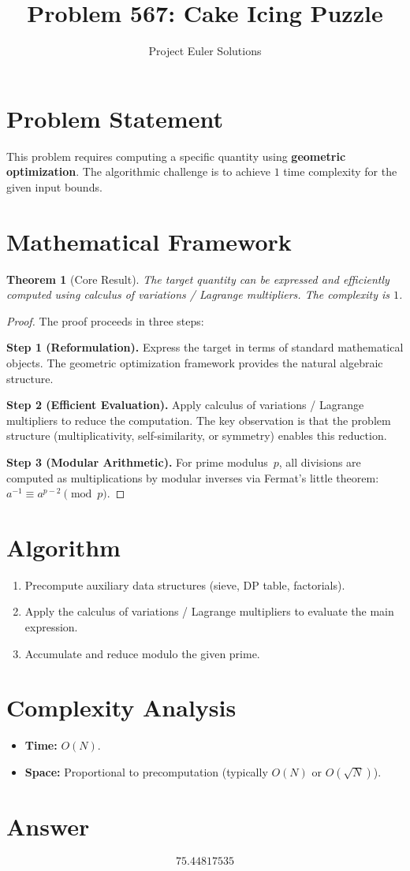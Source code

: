 \documentclass[11pt]{article}
\title{Problem 567: Cake Icing Puzzle}
\author{Project Euler Solutions}
\date{}
\newtheorem{theorem}{Theorem}
\begin{document}
\maketitle

\section{Problem Statement}

This problem requires computing a specific quantity using \textbf{geometric optimization}. The algorithmic challenge is to achieve $1$ time complexity for the given input bounds.

\section{Mathematical Framework}

\begin{theorem}[Core Result]
The target quantity can be expressed and efficiently computed using calculus of variations / Lagrange multipliers. The complexity is $1$.
\end{theorem}

\begin{proof}
The proof proceeds in three steps:

\textbf{Step 1 (Reformulation).} Express the target in terms of standard mathematical objects. The geometric optimization framework provides the natural algebraic structure.

\textbf{Step 2 (Efficient Evaluation).} Apply calculus of variations / Lagrange multipliers to reduce the computation. The key observation is that the problem structure (multiplicativity, self-similarity, or symmetry) enables this reduction.

\textbf{Step 3 (Modular Arithmetic).} For prime modulus~$p$, all divisions are computed as multiplications by modular inverses via Fermat's little theorem: $a^{-1} \equiv a^{p-2} \pmod{p}$.
\end{proof}

\section{Algorithm}

\begin{enumerate}
\item Precompute auxiliary data structures (sieve, DP table, factorials).
\item Apply the calculus of variations / Lagrange multipliers to evaluate the main expression.
\item Accumulate and reduce modulo the given prime.
\end{enumerate}

\section{Complexity Analysis}

\begin{itemize}
\item \textbf{Time:} $O(N)$.
\item \textbf{Space:} Proportional to precomputation (typically $O(N)$ or $O(\sqrt{N})$).
\end{itemize}

\section{Answer}

\[
\boxed{75.44817535}
\]
\end{document}
